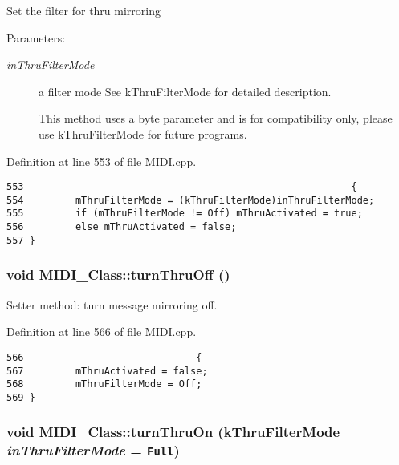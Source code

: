 Set the filter for thru mirroring \begin{Desc}
\item[Parameters:]
\begin{description}
\item[{\em inThruFilterMode}]a filter mode See kThruFilterMode for detailed description. \par
 This method uses a byte parameter and is for compatibility only, please use kThruFilterMode for future programs. \end{description}
\end{Desc}


Definition at line 553 of file MIDI.cpp.

\begin{Code}\begin{verbatim}553                                                         { 
554         mThruFilterMode = (kThruFilterMode)inThruFilterMode;
555         if (mThruFilterMode != Off) mThruActivated = true;
556         else mThruActivated = false;
557 }
\end{verbatim}
\end{Code}


\hypertarget{class_m_i_d_i___class_c1999ba222737523008d6f1c579d6816}{
\subsubsection[{turnThruOff}]{\setlength{\rightskip}{0pt plus 5cm}void MIDI\_\-Class::turnThruOff ()}}
\label{class_m_i_d_i___class_c1999ba222737523008d6f1c579d6816}


Setter method: turn message mirroring off. 

Definition at line 566 of file MIDI.cpp.

\begin{Code}\begin{verbatim}566                              {
567         mThruActivated = false; 
568         mThruFilterMode = Off;
569 }
\end{verbatim}
\end{Code}


\hypertarget{class_m_i_d_i___class_7fd1759eda22c18f6122b4231e1f0a6d}{
\subsubsection[{turnThruOn}]{\setlength{\rightskip}{0pt plus 5cm}void MIDI\_\-Class::turnThruOn ({\bf kThruFilterMode} {\em inThruFilterMode} = {\tt Full})}}
\label{class_m_i_d_i___class_7fd1759eda22c18f6122b4231e1f0a6d}


